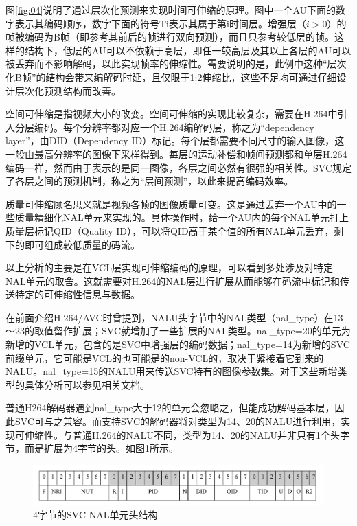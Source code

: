 图\ref{fig:04}说明了通过层次化预测来实现时间可伸缩的原理。图中一个AU下面的数字表示其编码顺序，数字下面的符号Ti表示其属于第i时间层。增强层（$i>0$）的帧被编码为B帧（即参考其前后的帧进行双向预测），而且只参考较低层的帧。这样的结构下，低层的AU可以不依赖于高层，即任一较高层及其以上各层的AU可以被丢弃而不影响解码，以此实现帧率的伸缩性。需要说明的是，此例中这种“层次化B帧”的结构会带来编解码时延，且仅限于1:2伸缩比，这些不足均可通过仔细设计层次化预测结构而改善。

空间可伸缩是指视频大小的改变。空间可伸缩的实现比较复杂，需要在H.264中引入分层编码。每个分辨率都对应一个H.264编解码层，称之为“dependency layer”，由DID（Dependency ID）标记。每个层都需要不同尺寸的输入图像，这一般由最高分辨率的图像下采样得到。每层的运动补偿和帧间预测都和单层H.264编码一样，然而由于表示的是同一图像，各层之间必然有很强的相关性。SVC规定了各层之间的预测机制，称之为“层间预测”，以此来提高编码效率。

质量可伸缩顾名思义就是视频各帧的图像质量可变。这是通过丢弃一个AU中的一些质量精细化NAL单元来实现的。具体操作时，给一个AU内的每个NAL单元打上质量层标记QID（Quality ID），可以将QID高于某个值的所有NAL单元丢弃，剩下的即可组成较低质量的码流。

以上分析的主要是在VCL层实现可伸缩编码的原理，可以看到多处涉及对特定NAL单元的取舍。这就需要对H.264的NAL层进行扩展从而能够在码流中标记和传送特定的可伸缩性信息与数据。

在前面介绍H.264/AVC时曾提到，NALU头字节中的NAL类型（nal\_type）在13～23的取值留作扩展；SVC就增加了一些扩展的NAL类型。nal\_type=20的单元为新增的VCL单元，包含的是SVC中增强层的编码数据；nal\_type=14为新增的SVC前缀单元，它可能是VCL的也可能是的non-VCL的，取决于紧接着它到来的NALU。nal\_type=15的NALU用来传送SVC特有的图像参数集。对于这些新增类型的具体分析可以参见相关文档\supercite{SVC-Interface}。

普通H264解码器遇到nal\_type大于12的单元会忽略之，但能成功解码基本层，因此SVC可与之兼容。而支持SVC的解码器将对类型为14、20的NALU进行利用，实现可伸缩性。与普通H.264的NALU不同，类型为14、20的NALU并非只有1个头字节，而是扩展为4字节的头。如图\ref{fig:05}所示。

\begin{figure}[h]
	\centering
	\includegraphics[width = 1.0\linewidth]{clip/05.png}
	\caption{4字节的SVC NAL单元头结构\label{fig:05}}
\end{figure}

